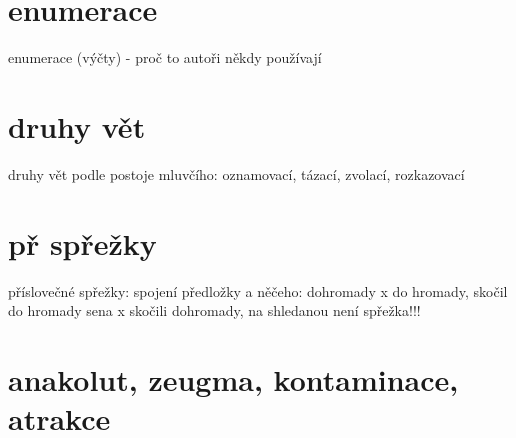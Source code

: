 \documentclass{memoir}
\begin{document}
\section*{enumerace}
enumerace (výčty) - proč to autoři někdy používají

\section*{druhy vět}
druhy vět podle postoje mluvčího: oznamovací, tázací, zvolací, rozkazovací

\section*{př spřežky}
příslovečné spřežky: spojení předložky a něčeho: dohromady x do hromady, skočil do hromady sena x skočili dohromady, na shledanou není spřežka!!!

\section*{anakolut, zeugma, kontaminace, atrakce}
\end{document}
